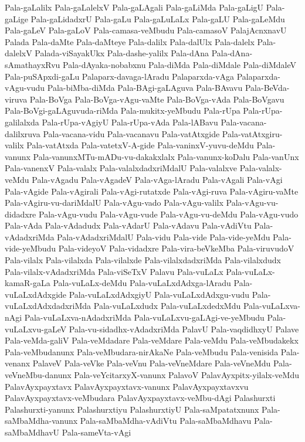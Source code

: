 {Pala-gaLalilx
Pala-gaLalelxV
Pala-gaLAgali
Pala-gaLiMda
Pala-gaLigU
Pala-gaLige
Pala-gaLidadxrU
Pala-gaLu
Pala-gaLuLaLx
Pala-gaLU
Pala-gaLeMdu
Pala-gaLeV
Pala-gaLoV
Pala-camasa-veMbudu
Pala-camasoV
PalajAcnxnavU
Palada
Pala-daMte
Pala-daMteye
Pala-dalilx
Pala-dalUlx
Pala-dalelx
Pala-dalelxV
Palada-viSayakUkx
Pala-dashe-yalilx
Pala-dAna
Pala-dAna-sAmathayxRvu
Pala-dAyaka-nobabxnu
Pala-diMda
Pala-diMdale
Pala-diMdaleV
Pala-puSApxdi-gaLu
Palaparx-davaga-lAradu
Palaparxda-vAga
Palaparxda-vAgu-vudu
Pala-biMba-diMda
Pala-BAgi-gaLAguva
Pala-BAvavu
Pala-BeVda-viruva
Pala-BoVga
Pala-BoVga-vAgu-vaMte
Pala-BoVga-vAda
Pala-BoVgavu
Pala-BoVgi-gaLAguvuda-riMda
Pala-mukitx-yeMbudu
Pala-rUpa
Pala-rUpa-galilalxda
Pala-rUpa-vAgiyU
Pala-rUpa-vAda
Pala-lABavu
Pala-vacana-dalilxruva
Pala-vacana-vidu
Pala-vacanavu
Pala-vatAtxgide
Pala-vatAtxgiru-valilx
Pala-vatAtxda
Pala-vatetxV-A-gide
Pala-vaninxV-yuvu-deMdu
Pala-vanunx
Pala-vanunxMTu-mADu-vu-dakakxlalx
Pala-vanunx-koDalu
Pala-vanUnx
Pala-vanenxV
Pala-valalx
Pala-valalxdadxriMdalU
Pala-valalxve
Pala-valalx-veMdu
Pala-vAgadu
Pala-vAgadeV
Pala-vAga-lAradu
Pala-vAgali
Pala-vAgi
Pala-vAgide
Pala-vAgirali
Pala-vAgi-rutatxde
Pala-vAgi-ruva
Pala-vAgiru-vaMte
Pala-vAgiru-vu-dariMdalU
Pala-vAgu-vado
Pala-vAgu-valilx
Pala-vAgu-vu-didadxre
Pala-vAgu-vudu
Pala-vAgu-vude
Pala-vAgu-vu-deMdu
Pala-vAgu-vudo
Pala-vAda
Pala-vAdadudx
Pala-vAdarU
Pala-vAdavu
Pala-vAdiVtu
Pala-vAdadxriMda
Pala-vAdadxriMdalU
Pala-vidu
Pala-vide
Pala-vide-yeMdu
Pala-vide-yeMbudu
Pala-videyoV
Pala-vidadxre
Pala-vira-beVkeMba
Pala-viruvudoV
Pala-vilalx
Pala-vilalxda
Pala-vilalxde
Pala-vilalxdadxriMda
Pala-vilalxdudx
Pala-vilalx-vAdadxriMda
Pala-viSeTxV
Palavu
Pala-vuLaLx
Pala-vuLaLx-kamaR-gaLa
Pala-vuLaLx-deMdu
Pala-vuLaLxdAdxga-lAradu
Pala-vuLaLxdAdxgide
Pala-vuLaLxdAdxgiyU
Pala-vuLaLxdAdxgu-vudu
Pala-vuLaLxdAdxdadxriMda
Pala-vuLaLxdudx
Pala-vuLaLxdedxMdu
Pala-vuLaLxva-nAgi
Pala-vuLaLxva-nAdadxriMda
Pala-vuLaLxvu-gaLAgi-ve-yeMbudu
Pala-vuLaLxvu-gaLeV
Pala-vu-sidadhx-vAdadxriMda
PalavU
Pala-vaqdidhxyU
Palave
Pala-veMda-galiV
Pala-veMdadare
Pala-veMdare
Pala-veMdu
Pala-veMbudakekx
Pala-veMbudanunx
Pala-veMbudara-nirAkaNe
Pala-veMbudu
Pala-venisida
Pala-venanx
PalaveV
Pala-veVke
Pala-veVnu
Pala-veVneMdare
Pala-veVneMdu
Pala-veVneMbu-danunx
Pala-veYcitarxyX-vanunx
PalavoV
PalavAyxpitx-yilalx-veMdu
PalavAyxpayxtavx
PalavAyxpayxtavx-vanunx
PalavAyxpayxtavxvu
PalavAyxpayxtavx-veMbudara
PalavAyxpayxtavx-veMbu-dAgi
Palashurxti
Palashurxti-yanunx
Palashurxtiyu
PalashurxtiyU
Pala-saMpatatxnunx
Pala-saMbaMdha-vanunx
Pala-saMbaMdha-vAdiVtu
Pala-saMbaMdhavu
Pala-saMbaMdhavU
Pala-sameVta-vAgi
}
